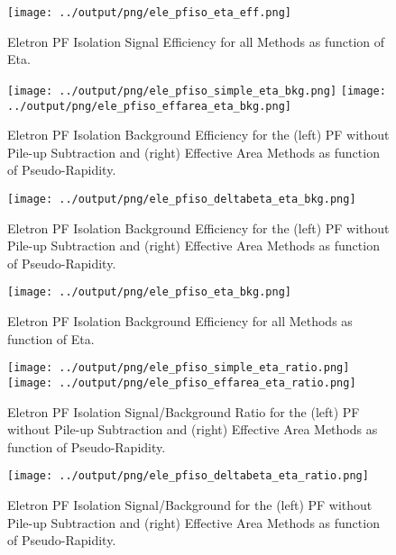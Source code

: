 \documentclass[11pt]{book}
\begin{document}
\begin{figure}[htb]
\centering
\texttt{[image: ../output/png/ele\_pfiso\_eta\_eff.png]}
\caption{Eletron PF Isolation Signal Efficiency for all Methods as function of Eta.}
\label{fig:ele_pfiso_eta_eff}
\end{figure}

\begin{figure}[htb]
\centering
\texttt{[image: ../output/png/ele\_pfiso\_simple\_eta\_bkg.png]}
\texttt{[image: ../output/png/ele\_pfiso\_effarea\_eta\_bkg.png]}
\caption{Eletron PF Isolation Background Efficiency for the (left) PF without Pile-up Subtraction and (right) Effective Area Methods as function of Pseudo-Rapidity.}
\label{fig:ele_pfiso_eta_bkg_simple_effarea}
\end{figure}

\begin{figure}[htb]
\centering
\texttt{[image: ../output/png/ele\_pfiso\_deltabeta\_eta\_bkg.png]}
\caption{Eletron PF Isolation Background Efficiency for the (left) PF without Pile-up Subtraction and (right) Effective Area Methods as function of Pseudo-Rapidity.}
\label{fig:ele_pfiso_eta_bkg_deltabeta}
\end{figure}

\begin{figure}[htb]
\centering
\texttt{[image: ../output/png/ele\_pfiso\_eta\_bkg.png]}
\caption{Eletron PF Isolation Background Efficiency for all Methods as function of Eta.}
\label{fig:ele_pfiso_eta_bkg}
\end{figure}

\begin{figure}[htb]
\centering
\texttt{[image: ../output/png/ele\_pfiso\_simple\_eta\_ratio.png]}
\texttt{[image: ../output/png/ele\_pfiso\_effarea\_eta\_ratio.png]}
\caption{Eletron PF Isolation Signal/Background Ratio for the (left) PF without Pile-up Subtraction and (right) Effective Area Methods as function of Pseudo-Rapidity.}
\label{fig:ele_pfiso_eta_ratio_simple_effarea}
\end{figure}

\begin{figure}[htb]
\centering
\texttt{[image: ../output/png/ele\_pfiso\_deltabeta\_eta\_ratio.png]}
\caption{Eletron PF Isolation Signal/Background for the (left) PF without Pile-up Subtraction and (right) Effective Area Methods as function of Pseudo-Rapidity.}
\label{fig:ele_pfiso_eta_ratio_deltabeta}
\end{figure}
\end{document}
